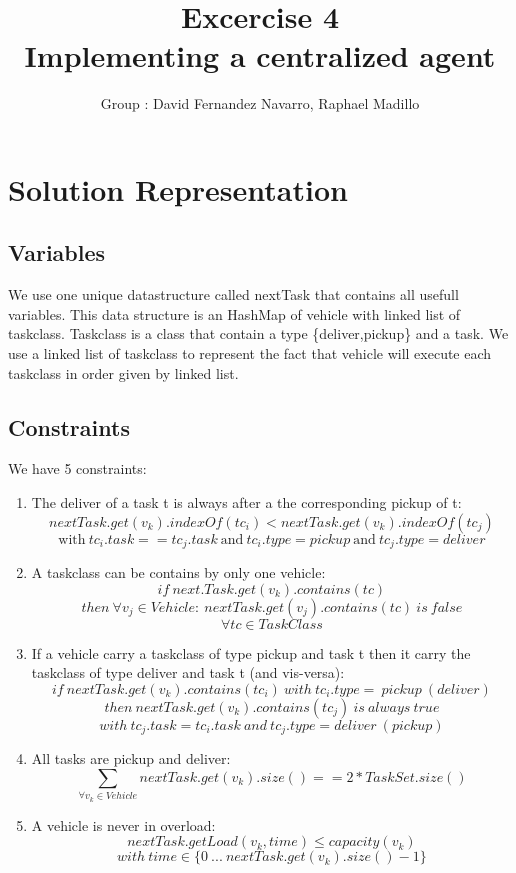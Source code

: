 \documentclass[10.5pt]{article}
\title{\bf Excercise 4\\ Implementing a centralized agent}
\author{Group \textnumero20 : David Fernandez Navarro, Raphael Madillo}
\begin{document}
\maketitle

\section{Solution Representation}

\subsection{Variables}
We use one unique datastructure called nextTask that contains all usefull variables. This data structure is an HashMap of vehicle with linked list of taskclass. Taskclass is a class that contain a type \{deliver,pickup\} and a task. We use a linked list of taskclass to represent the fact that vehicle will execute each taskclass in order given by linked list.

\subsection{Constraints}
We have 5 constraints:
\begin{enumerate}
\item The deliver of a task t is always after a the corresponding pickup of t:\\
\[ nextTask.get(v_k).indexOf(tc_i) < nextTask.get(v_k).indexOf(tc_j)\]
\[\textrm{with}\ tc_i.task == tc_j.task \ \textrm{and}\  tc_i.type = pickup \ \textrm{and}\ tc_j.type = deliver\] 
\item A taskclass can be contains by only one vehicle:\\
\[if \ next.Task.get(v_k).contains(tc) \]
\[ then \ \forall v_j \in Vehicle  : \ nextTask.get(v_j).contains(tc) \ is \ false \]
\[ \forall tc \in TaskClass\]
\item If a vehicle carry a taskclass of type pickup and task t then it carry the taskclass of type deliver and task t (and vis-versa):
\[ if \ nextTask.get(v_k).contains(tc_i) \ with \ tc_i.type = \ pickup \ (deliver) \]
\[then \ nextTask.get(v_k).contains(tc_j) \ is \ always \ true \]
\[ with \ tc_j.task = tc_i.task \ and \ tc_j.type = deliver \ (pickup) \]
\item All tasks are pickup and deliver:
\[ \sum_{\forall v_k \in Vehicle} nextTask.get(v_k).size() == 2*TaskSet.size() \]
\item A vehicle is never in overload:
\[ nextTask.getLoad(v_k,time) \leq capacity(v_k) \]
\[with \ time \in \{0 \ ... \ nextTask.get(v_k).size() -1\} \]
\end{enumerate}
\end{document}
